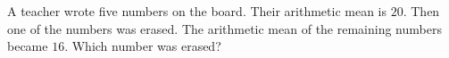 A teacher wrote five numbers on the board. Their arithmetic mean is $20$. Then one of the numbers was erased. The arithmetic mean of the remaining numbers became $16$. Which number was erased?
